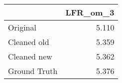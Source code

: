 \begin{tabular}{lr}
\toprule
{} & LFR_om_3 \\
\midrule
Original     &    5.110 \\
Cleaned old  &    5.359 \\
Cleaned new  &    5.362 \\
Ground Truth &    5.376 \\
\bottomrule
\end{tabular}
